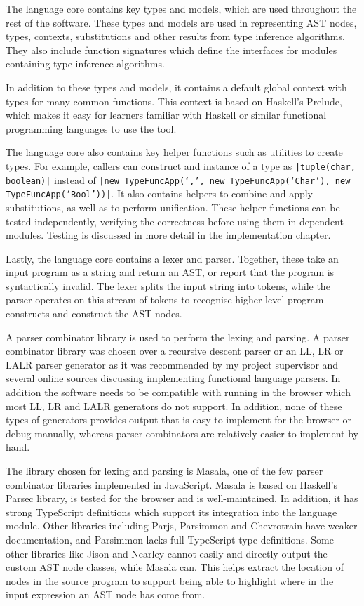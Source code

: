 \documentclass[a4paper,fleqn,twoside,12pt]{report}
\begin{document}
The language core contains key types and models, which are used throughout the rest of the software. These types and models are used in representing AST nodes, types, contexts, substitutions and other results from type inference algorithms. They also include function signatures which define the interfaces for modules containing type inference algorithms.

In addition to these types and models, it contains a default global context with types for many common functions. This context is based on Haskell’s Prelude, which makes it easy for learners familiar with Haskell or similar functional programming languages to use the tool.

The language core also contains key helper functions such as utilities to create types. For example, callers can construct and instance of a type as \texttt{|tuple(char, boolean)|} instead of \texttt{|new TypeFuncApp(‘,’, new TypeFuncApp(‘Char’), new TypeFuncApp(‘Bool’))|}. It also contains helpers to combine and apply substitutions, as well as to perform unification. These helper functions can be tested independently, verifying the correctness before using them in dependent modules. Testing is discussed in more detail in the implementation chapter.

Lastly, the language core contains a lexer and parser. Together, these take an input program as a string and return an AST, or report that the program is syntactically invalid. The lexer splits the input string into tokens, while the parser operates on this stream of tokens to recognise higher-level program constructs and construct the AST nodes.

A parser combinator library is used to perform the lexing and parsing. A parser combinator library was chosen over a recursive descent parser or an LL, LR or LALR parser generator as it was recommended by my project supervisor and several online sources discussing implementing functional language parsers. In addition the software needs to be compatible with running in the browser which most LL, LR and LALR generators do not support. In addition, none of these types of generators provides output that is easy to implement for the browser or debug manually, whereas parser combinators are relatively easier to implement by hand.

The library chosen for lexing and parsing is Masala, one of the few parser combinator libraries implemented in JavaScript. Masala is based on Haskell’s Parsec library, is tested for the browser and is well-maintained. In addition, it has strong TypeScript definitions which support its integration into the language module. Other libraries including Parjs, Parsimmon and Chevrotrain have weaker documentation, and Parsimmon lacks full TypeScript type definitions. Some other libraries like Jison and Nearley cannot easily and directly output the custom AST node classes, while Masala can. This helps extract the location of nodes in the source program to support being able to highlight where in the input expression an AST node has come from.
\end{document}
